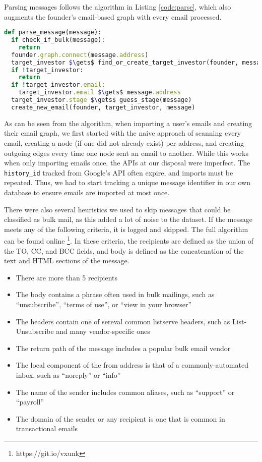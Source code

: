 Parsing messages follows the algorithm in Listing \ref{code:parse}, which also augments the founder's email-based graph with every email processed.

\begin{lstlisting}[float,frame=single,mathescape=true,language=Ruby,basicstyle=\footnotesize,columns=fullflexible,caption={Parse Message},label={code:parse}]
def parse_message(message):
  if check_if_bulk(message):
    return
  founder.graph.connect(message.address)
  target_investor $\gets$ find_or_create_target_investor(founder, message)
  if !target_investor:
    return
  if !target_investor.email:
    target_investor.email $\gets$ message.address
  target_investor.stage $\gets$ guess_stage(message)
  create_new_email(founder, target_investor, message)
\end{lstlisting}

As can be seen from the algorithm, when importing a user's emails and creating their email graph, we first started with the naive approach of scanning every email, creating a node (if one did not already exist) per address, and creating outgoing edges every time one node sent an email to another. While this works when only importing emails once, the APIs at our disposal were imperfect. The \texttt{history\_id} tracked from Google's API often expire, and imports must be repeated. Thus, we had to start tracking a unique message identifier in our own database to ensure emails are imported at most once.

There were also several heuristics we used to skip messages that could be classified as bulk mail, as this added a lot of noise to the dataset. If the message meets any of the following criteria, it is logged and skipped. The full algorithm can be found online \footnote{https://git.io/vxunk}. In these criteria, the recipients are defined as the union of the TO, CC, and BCC fields, and body is defined as the concatenation of the text and HTML sections of the message.

\begin{itemize}
  \item There are more than 5 recipients
  \item The body contains a phrase often used in bulk mailings, such as ``unsubscribe'', ``terms of use'', or ``view in your browser''
  \item The headers contain one of sereval common listserve headers, such as List-Unsubscribe and many vendor-specific ones
  \item The return path of the message includes a popular bulk email vendor
  \item The local component of the from address is that of a commonly-automated inbox, such as ``noreply'' or ``info''
  \item The name of the sender includes common aliases, such as ``support'' or ``payroll''
  \item The domain of the sender or any recipient is one that is common in transactional emails
\end{itemize}

